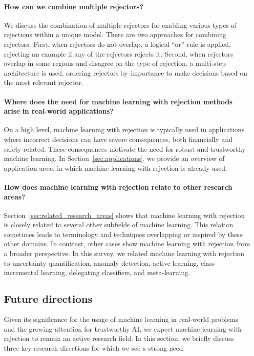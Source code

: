 \paragraph{How can we combine multiple rejectors?}
We discuss the combination of multiple rejectors for enabling various types of rejections within a unique model. There are two approaches for combining rejectors. First, when rejectors do not overlap, a logical ``or'' rule is applied, rejecting an example if any of the rejectors rejects it. Second, when rejectors overlap in some regions and disagree on the type of rejection, a multi-step architecture is used, ordering rejectors by importance to make decisions based on the most relevant rejector.

\paragraph{Where does the need for machine learning with rejection methods arise in real-world applications?}
On a high level, machine learning with rejection is typically used in applications where incorrect decisions can have severe consequences, both financially and safety-related. These consequences motivate the need for robust and trustworthy machine learning. In Section~\ref{sec:applications}, we provide an overview of application areas in which machine learning with rejection is already used.

\paragraph{How does machine learning with rejection relate to other research areas?}
Section~\ref{sec:related_research_areas} shows that machine learning with rejection is closely related to several other subfields of machine learning. This relation sometimes leads to terminology and techniques overlapping or inspired by these other domains. In contrast, other cases show machine learning with rejection from a broader perspective. In this survey, we related machine learning with rejection to uncertainty quantification, anomaly detection, active learning, class-incremental learning, delegating classifiers, and meta-learning.

\subsection{Future directions}
Given its significance for the usage of machine learning in real-world problems and the growing attention for trustworthy AI, we expect machine learning with rejection to remain an active research field. In this section, we briefly discuss three key research directions for which we see a strong need.


